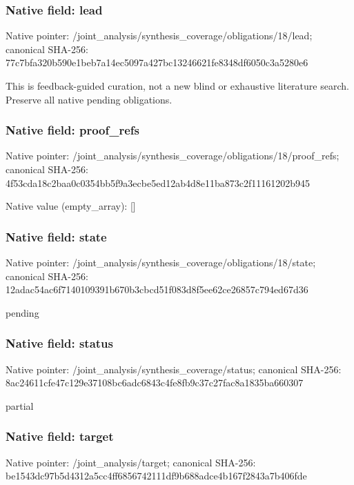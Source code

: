 \documentclass[10pt,a4paper]{article}
\begin{document}
\subsubsection{Native field: lead}
Native pointer: /joint\_\allowbreak{}analysis/synthesis\_\allowbreak{}coverage/obligations/18/lead; canonical SHA-256: 77c7bfa320b590e1beb7a14ec5097a427bc13246621fe8348df6050c3a5280e6

\begingroup\raggedright\sloppy This is feedback-guided curation,\allowbreak{} not a new blind or exhaustive literature search. Preserve all native pending obligations.\par\endgroup

\subsubsection{Native field: proof\_\allowbreak{}refs}
Native pointer: /joint\_\allowbreak{}analysis/synthesis\_\allowbreak{}coverage/obligations/18/proof\_\allowbreak{}refs; canonical SHA-256: 4f53cda18c2baa0c0354bb5f9a3ecbe5ed12ab4d8e11ba873c2f11161202b945

Native value (empty\_\allowbreak{}array): []

\subsubsection{Native field: state}
Native pointer: /joint\_\allowbreak{}analysis/synthesis\_\allowbreak{}coverage/obligations/18/state; canonical SHA-256: 12adac54ac6f7140109391b670b3cbcd51f083d8f5ee62ce26857c794ed67d36

\begingroup\raggedright\sloppy pending\par\endgroup

\subsubsection{Native field: status}
Native pointer: /joint\_\allowbreak{}analysis/synthesis\_\allowbreak{}coverage/status; canonical SHA-256: 8ac24611cfe47c129e37108bc6adc6843c4fe8fb9c37c27fac8a1835ba660307

\begingroup\raggedright\sloppy partial\par\endgroup

\subsubsection{Native field: target}
Native pointer: /joint\_\allowbreak{}analysis/target; canonical SHA-256: be1543dc97b5d4312a5cc4ff6856742111df9b688adce4b167f2843a7b406fde
\end{document}

